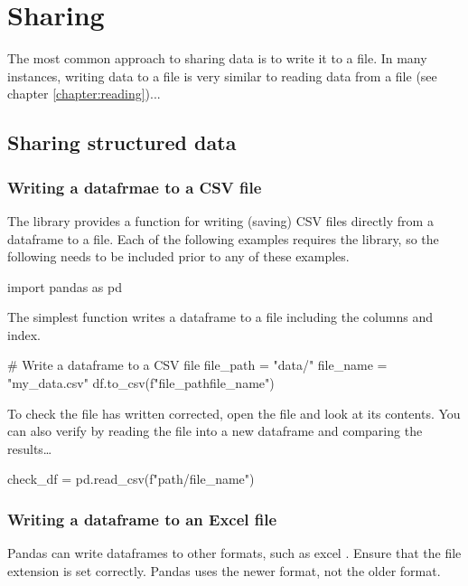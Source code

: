 \chapter{Sharing}
\label{chapter:sharing}

The most common approach to sharing data is to write it to a file. In many instances, writing data to a file is very similar to reading data from a file (see chapter \ref{chapter:reading})...

\section{Sharing structured data}

\subsection{Writing a datafrmae to a CSV file}

The  library provides a function for writing (saving) CSV files directly from a dataframe to a file. Each of the following examples requires the library, so the following  needs to be included prior to any of these examples.

\begin{pycode}
    import pandas as pd
\end{pycode}

The simplest  function writes a dataframe to a file including the columns and index.

\begin{pycode}
    # Write a dataframe to a CSV file
    file_path = "data/"
    file_name = "my_data.csv"
    df.to_csv(f"{file_path}{file_name}")
\end{pycode}

To check the file has written corrected, open the file and look at its contents. You can also verify by reading the file into a new dataframe and comparing the results\dots

\begin{pycode}
    check_df = pd.read_csv(f"{path}/{file_name}")
\end{pycode}

\subsection{Writing a dataframe to an Excel file}

Pandas can write dataframes to other formats, such as excel . Ensure that the file extension is set correctly. Pandas uses the newer  format, not the older  format.

